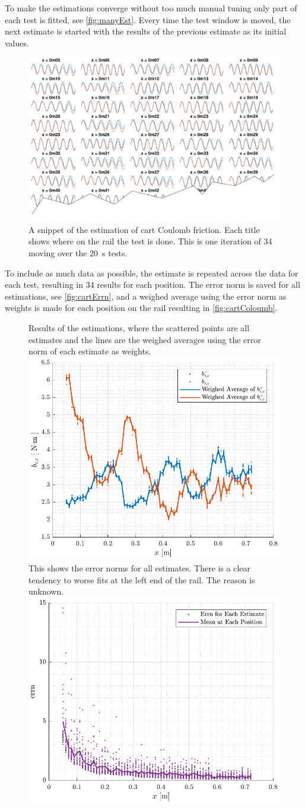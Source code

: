 To make the estimations converge without too much manual tuning only part of each test is fitted, see \autoref{fig:manyEst}. Every time the test window is moved, the next estimate is started with the results of the previous estimate as its initial values.
%
\begin{figure}[H]
  \includegraphics[width=.6\textwidth]{figures/manyEst_tear}
  \caption{A snippet of the estimation of cart Coulomb friction. Each title shows where on the rail the test is done. This is one iteration of 34 moving over the \SI{20}{s} tests.}
  \label{fig:manyEst}
\end{figure}
%
To include as much data as possible, the estimate is repeated across the data for each test, resulting in \num{34} results for each position. The error norm is saved for all estimations, see \autoref{fig:cartErrn}, and a weighed average using the error norm as weights is made for each position on the rail resulting in \autoref{fig:cartColoumb}.
%
\begin{figure}[H]
  \hspace{1cm}
  \captionbox
  {
    Results of the estimations, where the scattered points are all estimates and the lines are the weighed averages using the error norm of each estimate as weights.
    \label{fig:cartColoumb}
  }
  {
    \hspace{-1cm}
    \includegraphics[width=.45\textwidth]{figures/cartColoumb}
  }
  \hspace{20pt}
  \captionbox 
  {
    This shows the error norms for all estimates. There is a clear tendency to worse fits at the left end of the rail. The reason is unknown.
    \label{fig:cartErrn}
  }
  {
    \hspace{-1cm}
    \includegraphics[width=.45\textwidth]{figures/cartErrn}
  }  
\end{figure}
